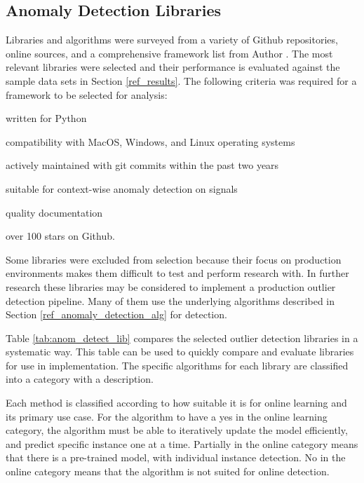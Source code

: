 \subsection{Anomaly Detection Libraries}
\label{ref_code_libraries}
 Libraries and algorithms were surveyed from a variety of Github repositories, online sources, and a comprehensive framework list from Author \cite{medico2020-ts-list}. The most relevant libraries were selected and their performance is evaluated against the sample data sets in Section \ref{ref_results}. The following criteria was required for a framework to be selected for analysis:
 \begin{inlinelist}
     \item written for Python
     \item compatibility with MacOS, Windows, and Linux operating systems
     \item actively maintained with git commits within the past two years
     \item suitable for context-wise anomaly detection on signals
     \item quality documentation
     \item over 100 stars on Github.
 \end{inlinelist}
 
 
Some libraries were excluded from selection because their focus on production environments makes them difficult to test and perform research with. In further research these libraries may be considered to implement a production outlier detection pipeline. Many of them use the underlying algorithms described in Section \ref{ref_anomaly_detection_alg} for detection. 
 
Table \ref{tab:anom_detect_lib} compares the selected outlier detection libraries in a systematic way. This table can be used to quickly compare and evaluate libraries for use in implementation. The specific algorithms for each library are classified into a category with a description.
 
Each method is classified according to how suitable it is for online learning and its primary use case. For the algorithm to have a yes in the online learning category, the algorithm must be able to iteratively update the model efficiently, and predict specific instance one at a time. Partially in the online category means that there is a pre-trained model, with individual instance detection. No in the online category means that the algorithm is not suited for online detection. 



